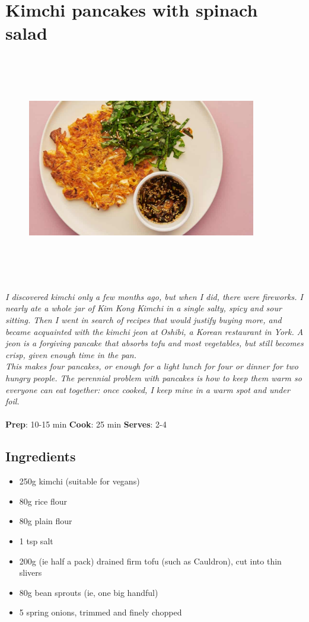 \documentclass{book}
\begin{document}
\section{Kimchi pancakes with spinach salad}
\begin{figure}
\centering\includegraphics[width=10cm,height=10cm,keepaspectratio]{Recipe_Pictures/Kimchi_pancakes_with_spinach_salad.png}
\end{figure}
\emph{I discovered kimchi only a few months ago, but when I did, there were fireworks. I nearly ate a whole jar of Kim Kong Kimchi in a single salty, spicy and sour sitting. Then I went in search of recipes that would justify buying more, and became acquainted with the kimchi jeon at Oshibi, a Korean restaurant in York. A jeon is a forgiving pancake that absorbs tofu and most vegetables, but still becomes crisp, given enough time in the pan.\\ 
This makes four pancakes, or enough for a light lunch for four or dinner for two hungry people. The perennial problem with pancakes is how to keep them warm so everyone can eat together: once cooked, I keep mine in a warm spot and under foil.}\\\\ 
\textbf{Prep}: 10-15 min
\textbf{Cook}: 25 min
\textbf{Serves}: 2-4
\subsection*{Ingredients}
\begin{itemize}
\item 250g kimchi (suitable for vegans) 
\item 80g rice flour 
\item 80g plain flour
\item 1 tsp salt 
\item 200g (ie half a pack) drained firm tofu (such as Cauldron), cut into thin slivers
\item 80g bean sprouts (ie, one big handful)
\item 5 spring onions, trimmed and finely chopped
\end{itemize}
\end{document}
